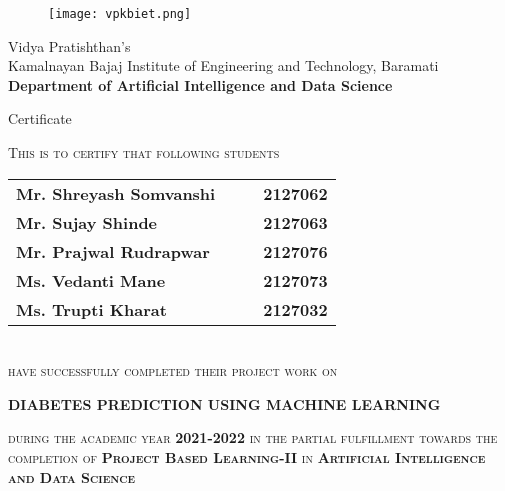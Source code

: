 \documentclass[pdftex,a4paper,11pt,oneside,openright]{report}
\begin{document}
\thispagestyle{empty}
\vspace{-50pt}
\begin{figure}[!h]
\begin{center}
\texttt{[image: vpkbiet.png]}
\vspace{-.8cm}
\end{center}
\end{figure}
\begin{center}			%
\linespread{1}
	\small{Vidya Pratishthan's} \\ \large{Kamalnayan Bajaj Institute of Engineering and Technology, Baramati}\\	
	\Large{\bf{Department of Artificial Intelligence and Data Science}}\\
	
\end{center}

\begin{center}
\Huge{{\swabfamily Certificate\\}}
	
\end{center}

\vspace{12pt}

\linespread{1}			%
\selectfont
\large{
\textsc{This is to certify that following students} 
\begin{table}[htbp]
	\begin{center}
	\begin{tabular}{ l c c l }
	
	\large\bf{Mr. Shreyash Somvanshi} & & & \large\bf{2127062} \\ [0.3cm]
\large\bf{Mr. Sujay Shinde} & & & \large\bf{2127063} \\ [0.3cm]
\large\bf{Mr. Prajwal Rudrapwar} & & & \large\bf{2127076} \\ [0.3cm]
\large\bf{Ms. Vedanti Mane} & & & \large\bf{2127073} \\ [0.3cm]
\large\bf{Ms. Trupti Kharat} & & & \large\bf{2127032} \\ [0.3cm]
		\end{tabular}
	\end{center}
	\end{table} \\
		\textsc{	have successfully completed their project work on}
	\begin{center}
	  {\bf DIABETES PREDICTION USING MACHINE LEARNING}
	\end{center}
\textsc{during the academic year \textbf{2021-2022} in the partial fulfillment towards the completion of \textbf{Project Based Learning-II} in \textbf{Artificial Intelligence and Data Science}}
}
\end{document}
